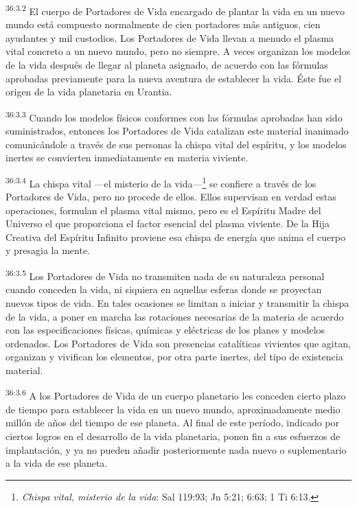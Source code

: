 \par
\textsuperscript{36:3.2} El cuerpo de Portadores de Vida encargado de plantar la vida en un nuevo mundo está compuesto normalmente de cien portadores más antiguos, cien ayudantes y mil custodios. Los Portadores de Vida llevan a menudo el plasma vital concreto a un nuevo mundo, pero no siempre. A veces organizan los modelos de la vida después de llegar al planeta asignado, de acuerdo con las fórmulas aprobadas previamente para la nueva aventura de establecer la vida. Éste fue el origen de la vida planetaria en Urantia.

\par
\textsuperscript{36:3.3} Cuando los modelos físicos conformes con las fórmulas aprobadas han sido suministrados, entonces los Portadores de Vida catalizan este material inanimado comunicándole a través de sus personas la chispa vital del espíritu, y los modelos inertes se convierten inmediatamente en materia viviente.

\par
\textsuperscript{36:3.4} La chispa vital ---el misterio de la vida---\footnote{\textit{Chispa vital, misterio de la vida}: Sal 119:93; Jn 5:21; 6:63; 1 Ti 6:13.} se confiere a través de los Portadores de Vida, pero no procede de ellos. Ellos supervisan en verdad estas operaciones, formulan el plasma vital mismo, pero es el Espíritu Madre del Universo el que proporciona el factor esencial del plasma viviente. De la Hija Creativa del Espíritu Infinito proviene esa chispa de energía que anima el cuerpo y presagia la mente.

\par
\textsuperscript{36:3.5} Los Portadores de Vida no transmiten nada de su naturaleza personal cuando conceden la vida, ni siquiera en aquellas esferas donde se proyectan nuevos tipos de vida. En tales ocasiones se limitan a iniciar y transmitir la chispa de la vida, a poner en marcha las rotaciones necesarias de la materia de acuerdo con las especificaciones físicas, químicas y eléctricas de los planes y modelos ordenados. Los Portadores de Vida son presencias catalíticas vivientes que agitan, organizan y vivifican los elementos, por otra parte inertes, del tipo de existencia material.

\par
\textsuperscript{36:3.6} A los Portadores de Vida de un cuerpo planetario les conceden cierto plazo de tiempo para establecer la vida en un nuevo mundo, aproximadamente medio millón de años del tiempo de ese planeta. Al final de este período, indicado por ciertos logros en el desarrollo de la vida planetaria, ponen fin a sus esfuerzos de implantación, y ya no pueden añadir posteriormente nada nuevo o suplementario a la vida de ese planeta.


